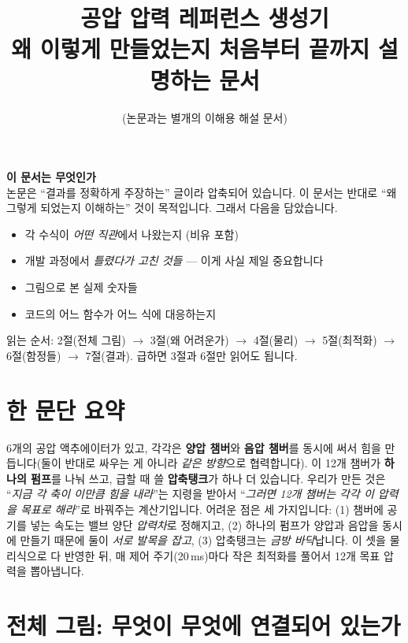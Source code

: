 \documentclass[11pt]{article}
\title{\bf\kosans 공압 압력 레퍼런스 생성기\\[2mm]
\large 왜 이렇게 만들었는지 처음부터 끝까지 설명하는 문서}
\author{\kosans (논문과는 별개의 이해용 해설 문서)}
\date{}
\begin{document}
\maketitle

\begin{tcolorbox}[colback=gray!8,colframe=gray!60,arc=2pt]
\textbf{\kosans 이 문서는 무엇인가}\\[2mm]
논문은 ``결과를 정확하게 주장하는'' 글이라 압축되어 있습니다. 이 문서는 반대로
``왜 그렇게 되었는지 이해하는'' 것이 목적입니다. 그래서 다음을 담았습니다.
\begin{itemize}[leftmargin=1.2em,itemsep=1pt]
\item 각 수식이 \emph{어떤 직관}에서 나왔는지 (비유 포함)
\item 개발 과정에서 \emph{틀렸다가 고친 것들} --- 이게 사실 제일 중요합니다
\item 그림으로 본 실제 숫자들
\item 코드의 어느 함수가 어느 식에 대응하는지
\end{itemize}
읽는 순서: 2절(전체 그림) $\to$ 3절(왜 어려운가) $\to$ 4절(물리) $\to$
5절(최적화) $\to$ 6절(함정들) $\to$ 7절(결과). 급하면 3절과 6절만 읽어도 됩니다.
\end{tcolorbox}

\tableofcontents

\newpage
\section{한 문단 요약}

6개의 공압 액추에이터가 있고, 각각은 \textbf{양압 챔버}와 \textbf{음압 챔버}를
동시에 써서 힘을 만듭니다(둘이 반대로 싸우는 게 아니라 \emph{같은 방향}으로
협력합니다). 이 12개 챔버가 \textbf{하나의 펌프}를 나눠 쓰고, 급할 때 쓸
\textbf{압축탱크}가 하나 더 있습니다. 우리가 만든 것은
``\emph{지금 각 축이 이만큼 힘을 내라}''는 지령을 받아서
``\emph{그러면 12개 챔버는 각각 이 압력을 목표로 해라}''로 바꿔주는 계산기입니다.
어려운 점은 세 가지입니다: (1) 챔버에 공기를 넣는 속도는 밸브 양단 \emph{압력차}로
정해지고, (2) 하나의 펌프가 양압과 음압을 동시에 만들기 때문에 둘이 \emph{서로
발목을 잡고}, (3) 압축탱크는 \emph{금방 바닥}납니다. 이 셋을 물리식으로 다 반영한
뒤, 매 제어 주기(20\,ms)마다 작은 최적화를 풀어서 12개 목표 압력을 뽑아냅니다.

\section{전체 그림: 무엇이 무엇에 연결되어 있는가}
\end{document}
